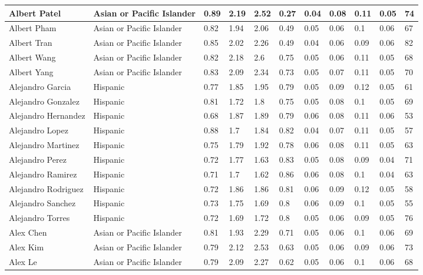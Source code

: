 \begin{table}[!ht]
\begin{tabular}{|l|l|l|l|l|l|l|l|l|l|l|}
        Albert Patel & Asian or Pacific Islander & 0.89 & 2.19 & 2.52 & 0.27 & 0.04 & 0.08 & 0.11 & 0.05 & 74 \\ \hline
        Albert Pham & Asian or Pacific Islander & 0.82 & 1.94 & 2.06 & 0.49 & 0.05 & 0.06 & 0.1 & 0.06 & 67 \\ \hline
        Albert Tran & Asian or Pacific Islander & 0.85 & 2.02 & 2.26 & 0.49 & 0.04 & 0.06 & 0.09 & 0.06 & 82 \\ \hline
        Albert Wang & Asian or Pacific Islander & 0.82 & 2.18 & 2.6 & 0.75 & 0.05 & 0.06 & 0.11 & 0.05 & 68 \\ \hline
        Albert Yang & Asian or Pacific Islander & 0.83 & 2.09 & 2.34 & 0.73 & 0.05 & 0.07 & 0.11 & 0.05 & 70 \\ \hline
        Alejandro Garcia & Hispanic & 0.77 & 1.85 & 1.95 & 0.79 & 0.05 & 0.09 & 0.12 & 0.05 & 61 \\ \hline
        Alejandro Gonzalez & Hispanic & 0.81 & 1.72 & 1.8 & 0.75 & 0.05 & 0.08 & 0.1 & 0.05 & 69 \\ \hline
        Alejandro Hernandez & Hispanic & 0.68 & 1.87 & 1.89 & 0.79 & 0.06 & 0.08 & 0.11 & 0.06 & 53 \\ \hline
        Alejandro Lopez & Hispanic & 0.88 & 1.7 & 1.84 & 0.82 & 0.04 & 0.07 & 0.11 & 0.05 & 57 \\ \hline
        Alejandro Martinez & Hispanic & 0.75 & 1.79 & 1.92 & 0.78 & 0.06 & 0.08 & 0.11 & 0.05 & 63 \\ \hline
        Alejandro Perez & Hispanic & 0.72 & 1.77 & 1.63 & 0.83 & 0.05 & 0.08 & 0.09 & 0.04 & 71 \\ \hline
        Alejandro Ramirez & Hispanic & 0.71 & 1.7 & 1.62 & 0.86 & 0.06 & 0.08 & 0.1 & 0.04 & 63 \\ \hline
        Alejandro Rodriguez & Hispanic & 0.72 & 1.86 & 1.86 & 0.81 & 0.06 & 0.09 & 0.12 & 0.05 & 58 \\ \hline
        Alejandro Sanchez & Hispanic & 0.73 & 1.75 & 1.69 & 0.8 & 0.06 & 0.09 & 0.1 & 0.05 & 55 \\ \hline
        Alejandro Torres & Hispanic & 0.72 & 1.69 & 1.72 & 0.8 & 0.05 & 0.06 & 0.09 & 0.05 & 76 \\ \hline
        Alex Chen & Asian or Pacific Islander & 0.81 & 1.93 & 2.29 & 0.71 & 0.05 & 0.06 & 0.1 & 0.06 & 69 \\ \hline
        Alex Kim & Asian or Pacific Islander & 0.79 & 2.12 & 2.53 & 0.63 & 0.05 & 0.06 & 0.09 & 0.06 & 73 \\ \hline
        Alex Le & Asian or Pacific Islander & 0.79 & 2.09 & 2.27 & 0.62 & 0.05 & 0.06 & 0.1 & 0.06 & 68 \\ \hline

\end{tabular}
\end{table}
